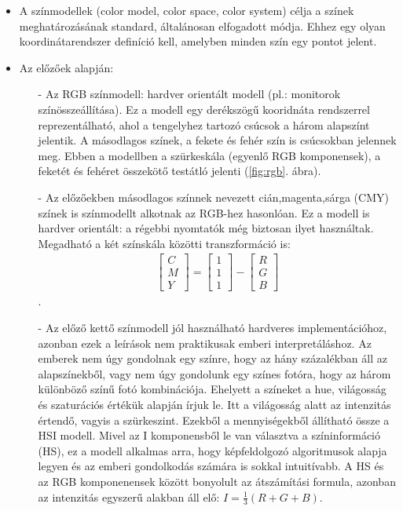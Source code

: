 \documentclass[12pt]{article}
\theoremstyle{plain}
\begin{document}
\begin{itemize}
    \item A színmodellek (color model, color space, color system) célja a színek meghatározásának standard, általánosan elfogadott módja. Ehhez egy olyan koordinátarendszer definíció kell, amelyben minden szín egy pontot jelent. 
    \item Az előzőek alapján:
    \begin{itemize}
        \item[-] Az RGB színmodell: hardver orientált modell (pl.: monitorok színösszeállítása). Ez a modell egy derékszögű kooridnáta rendszerrel reprezentálható, ahol a tengelyhez tartozó csúcsok a három alapszínt jelentik. A másodlagos színek, a fekete és fehér szín is csúcsokban jelennek meg. Ebben a modellben a szürkeskála (egyenlő RGB komponensek), a feketét és fehéret összekötő testátló jelenti (\ref{fig:rgb}. ábra).
        \item[-] Az előzőekben másodlagos színnek nevezett cián,magenta,sárga (CMY) színek is színmodellt alkotnak az RGB-hez hasonlóan. Ez a modell is hardver orientált: a régebbi nyomtatók még biztosan ilyet használtak. Megadható a két színskála közötti transzformáció is:
        \begin{align}
    \begin{bmatrix}
           C \\
           M \\
           Y
         \end{bmatrix} = 
             \begin{bmatrix}
           1 \\
           1 \\
           1
         \end{bmatrix} -
             \begin{bmatrix}
           R \\
           G \\
           B
         \end{bmatrix}
  \end{align}.
  \item[-] Az előző kettő színmodell jól használható hardveres implementációhoz, azonban ezek a leírások nem praktikusak emberi interpretáláshoz. Az emberek nem úgy gondolnak egy színre, hogy az hány százalékban áll az alapszínekből, vagy nem úgy gondolunk egy színes fotóra, hogy az három különböző színű fotó kombinációja. Ehelyett a színeket a hue, világosság és szaturációs értékük alapján írjuk le. Itt a világosság alatt az intenzitás értendő, vagyis a szürkeszint. Ezekből a mennyiségekből állítható össze a HSI modell. Mivel az I komponensből le van választva a színinformáció (HS), ez a modell alkalmas arra, hogy képfeldolgozó algoritmusok alapja legyen és az emberi gondolkodás számára is sokkal intuitívabb. A HS és az RGB komponenensek között bonyolult az átszámítási formula, azonban az intenzitás egyszerű alakban áll elő: $I = \frac{1}{3}(R+G+B).$
    \end{itemize}{}
\end{itemize}{}
\end{document}

